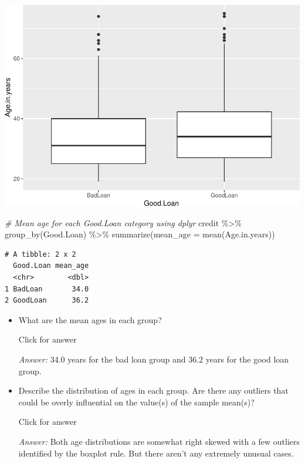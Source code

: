 \documentclass[
]{book}
\newenvironment{Shaded}{\begin{snugshade}}{\end{snugshade}}
\newcommand{\AttributeTok}[1]{\textcolor[rgb]{0.77,0.63,0.00}{#1}}
\newcommand{\CommentTok}[1]{\textcolor[rgb]{0.56,0.35,0.01}{\textit{#1}}}
\newcommand{\FunctionTok}[1]{\textcolor[rgb]{0.00,0.00,0.00}{#1}}
\newcommand{\NormalTok}[1]{#1}
\newcommand{\SpecialCharTok}[1]{\textcolor[rgb]{0.00,0.00,0.00}{#1}}
\providecommand{\tightlist}{%
  \setlength{\itemsep}{0pt}\setlength{\parskip}{0pt}}
\begin{document}
\includegraphics[width=1\linewidth]{Class_Activity_8_files/figure-latex/unnamed-chunk-4-1}

\begin{Shaded}
\begin{Highlighting}[]
\CommentTok{\# Mean age for each Good.Loan category using dplyr}
\NormalTok{credit }\SpecialCharTok{\%\textgreater{}\%}
  \FunctionTok{group\_by}\NormalTok{(Good.Loan) }\SpecialCharTok{\%\textgreater{}\%}
  \FunctionTok{summarize}\NormalTok{(}\AttributeTok{mean\_age =} \FunctionTok{mean}\NormalTok{(Age.in.years))}
\end{Highlighting}
\end{Shaded}

\begin{verbatim}
# A tibble: 2 x 2
  Good.Loan mean_age
  <chr>        <dbl>
1 BadLoan       34.0
2 GoodLoan      36.2
\end{verbatim}

\begin{itemize}
\tightlist
\item
  What are the mean ages in each group?

  Click for answer

  \emph{Answer:} 34.0 years for the bad loan group and 36.2 years for the good loan group.
\item
  Describe the distribution of ages in each group. Are there any outliers that could be overly influential on the value(s) of the sample mean(s)?

  Click for answer

  \emph{Answer:} Both age distributions are somewhat right skewed with a few outliers identified by the boxplot rule. But there aren't any extremely unusual cases.
\end{itemize}
\end{document}
